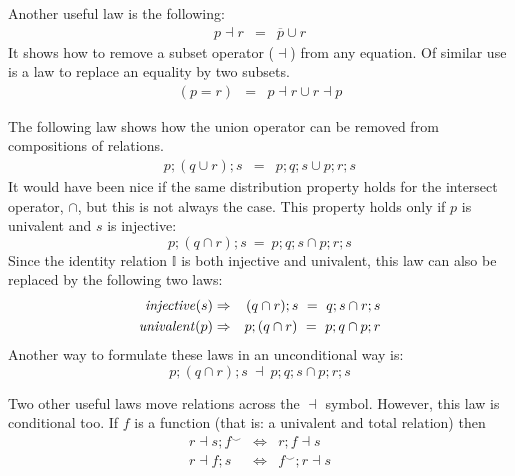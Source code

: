 \documentclass[11pt,a4paper,fleqn,oneside]{article}
\def\id#1{\text{\em #1\/}}
\newcommand{\univalent}[1]{\id{univalent}(#1)}
\newcommand{\injective}[1]{\id{injective}(#1)}
\newcommand{\iden}{\mathbb{I}}
\newcommand{\flip}[1]{{#1}^\smallsmile}
\newcommand{\cmpl}[1]{\overline{#1}}
\newcommand{\compose}{;}
\newcommand{\subs}{\dashv}
\begin{document}
	Another useful law is the following:
\begin{eqnarray}
p\subs r&=&\cmpl{p}\cup r\label{eqn:rid of subseteq}
\end{eqnarray}
	It shows how to remove a subset operator ($\subs$) from any equation.
	Of similar use is a law to replace an equality by two subsets.
\begin{eqnarray}
(p=r)&=&p\subs r \cup r\subs p\label{axi:rid of eq}
\end{eqnarray}
	
	The following law shows how the union operator can be removed from compositions of relations.
\begin{eqnarray}
p\compose(q\cup r)\compose s&=&p\compose q\compose s \cup p\compose r\compose s\label{axi:distributive cup}
\end{eqnarray}
	It would have been nice if the same distribution property holds for the intersect operator, $\cap$,
	but this is not always the case.
	This property holds only if $p$ is univalent and $s$ is injective:
\begin{equation}
p\compose(q\cap r)\compose s\ =\ p\compose q\compose s\cap p\compose r\compose s\label{prop:cap distr compo}
\end{equation}
	Since the identity relation $\iden$ is both injective and univalent,
	this law can also be replaced by the following two laws:
\begin{eqnarray}
\injective{s} & \Rightarrow & (q\cap r)\compose s\ =\ q\compose s\cap r\compose s\\
\univalent{p} & \Rightarrow & p\compose (q\cap r)\ =\ p\compose q\cap p\compose r
\end{eqnarray}
	Another way to formulate these laws in an unconditional way is:
\begin{equation}
	p\compose (q\cap r)\compose s\ \subs\ p\compose q\compose s\cap p\compose r\compose s
\label{axi:distributive cap}
\end{equation}

	Two other useful laws move relations across the $\subs$ symbol.
	However, this law is conditional too.
	If $f$ is a function (that is: a univalent and total relation) then
\begin{eqnarray}
r\subs s\compose\flip{f} & \Leftrightarrow & r\compose f\subs s\label{law:move function over subset right}\\
r\subs f\compose s        & \Leftrightarrow & \flip{f}\compose r\subs s\label{law:move function over subset left}
\end{eqnarray}
\end{document}
